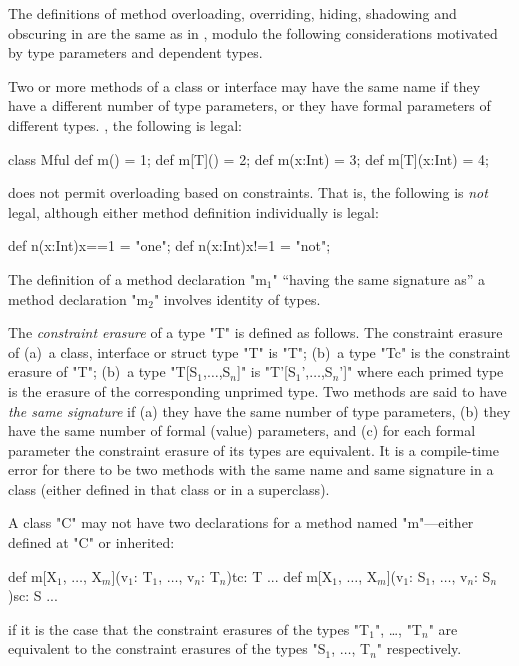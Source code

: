 The definitions of method overloading, overriding, hiding, shadowing
and obscuring in \Xten{} are the same as in \Java, modulo the following
considerations motivated by type parameters and dependent types.

Two or more methods of a class or interface may have the same
name if they have a different number of type parameters, or
they have formal parameters of different types.  \Eg, the following is legal: 

\begin{xten}
class Mful{
   def m() = 1;
   def m[T]() = 2;
   def m(x:Int) = 3;
   def m[T](x:Int) = 4;
}
\end{xten}
%

\XtenCurrVer{} does not permit overloading based on constraints. That is, the
following is {\em not} legal, although either method definition individually
is legal:
\begin{xten}
   def n(x:Int){x==1} = "one";
   def n(x:Int){x!=1} = "not";
\end{xten}


The definition of a method declaration \xcdmath"m$_1$" ``having the same signature
as'' a method declaration \xcdmath"m$_2$" involves identity of types. 

The {\em constraint erasure} of a type \xcdmath"T" is defined as follows.
The constraint erasure of  (a)~a class, interface or struct type \xcdmath"T" is 
\xcdmath"T"; (b)~a type \xcdmath"T{c}" is the constraint erasure of 
\xcdmath"T"; (b)~a type \xcdmath"T[S$_1$,$\ldots$,S$_n$]" 
is \xcdmath"T'[S$_1$',$\ldots$,S$_n$']" where each primed type is the erasure of 
the corresponding unprimed type.
 Two methods are said to have {\em the
  same signature} if (a) they have the same number of type parameters,
(b) they have the same number of formal (value) parameters, and (c)
for each formal parameter the constraint erasure of its types are equivalent. It is a
compile-time error for there to be two methods with the same name and
same signature in a class (either defined in that class or in a
superclass).

\begin{staticrule*}
  A class \xcd"C" may not have two declarations for a method named \xcd"m"---either
  defined at \xcd"C" or inherited:
\begin{xtenmath}
def m[X$_1$, $\dots$, X$_m$](v$_1$: T$_1$, $\dots$, v$_n$: T$_n$){tc}: T {...}
def m[X$_1$, $\dots$, X$_m$](v$_1$: S$_1$, $\dots$, v$_n$: S$_n$){sc}: S {...}
\end{xtenmath}
\noindent
if it is the case that the constraint erasures of the types \xcdmath"T$_1$",
\dots, \xcdmath"T$_n$" are
equivalent to the constraint erasures of the types \xcdmath"S$_1$, $\dots$, T$_n$"
respectively.
\end{staticrule*}

